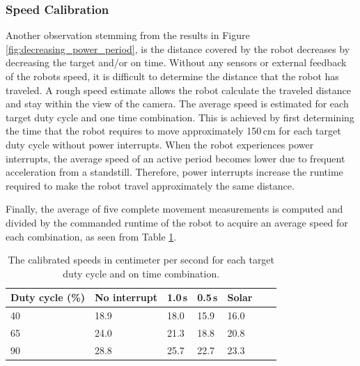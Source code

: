 \subsubsection{Speed Calibration}
Another observation stemming from the results in Figure \ref{fig:decreasing_power_period}, is the distance covered by the robot decreases by decreasing the target and/or on time.
Without any sensors or external feedback of the robots speed, it is difficult to determine the distance that the robot has traveled.
A rough speed estimate allows the robot calculate the traveled distance and stay within the view of the camera.
The average speed is estimated for each target duty cycle and one time combination.
This is achieved by first determining the time that the robot requires to move approximately 150\,cm for each target duty cycle without power interrupts.
When the robot experiences power interrupts, the average speed of an active period becomes lower due to frequent acceleration from a standstill.
Therefore, power interrupts increase the runtime required to make the robot travel approximately the same distance.

Finally, the average of five complete movement measurements is computed and divided by the commanded runtime of the robot to acquire an average speed for each combination, as seen from Table \ref{tab:val_calib}.


\begin{table}[t]
	\centering
	\small
	\caption{The calibrated speeds in centimeter per second for each target duty cycle and on time combination.}
	\label{tab:val_calib}
	\begin{tabular}{|l||l|l|l|l|l|l|}
		\hline
		Duty cycle (\%) & No interrupt & 1.0\,s & 0.5\,s & Solar \\
		\hline \hline
		 40 & 18.9 & 18.0 & 15.9 & 16.0\\
	     65 & 24.0 & 21.3 & 18.8 & 20.8\\
		 90 & 28.8 & 25.7 & 22.7 & 23.3\\
		\hline
	\end{tabular}
\end{table}


